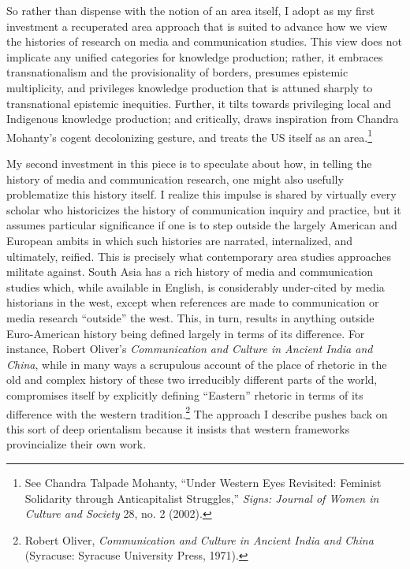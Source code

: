 \documentclass{tufte-handout}
\begin{document}
So rather than dispense with the notion of an area itself, I adopt as my
first investment a recuperated area approach that is suited to advance
how we view the histories of research on media and communication
studies. This view does not implicate any unified categories for
knowledge production; rather, it embraces transnationalism and the
provisionality of borders, presumes epistemic multiplicity, and
privileges knowledge production that is attuned sharply to transnational
epistemic inequities. Further, it tilts towards privileging local and
Indigenous knowledge production; and critically, draws inspiration from
Chandra Mohanty's cogent decolonizing gesture, and treats the US itself
as an area.\footnote{See Chandra Talpade Mohanty, ``Under Western Eyes
  Revisited: Feminist Solidarity through Anticapitalist Struggles,''
  \emph{Signs: Journal of Women in Culture and Society} 28, no. 2
  (2002).}

My second investment in this piece is to speculate about how, in telling
the history of media and communication research, one might also usefully
problematize this history itself. I realize this impulse is shared by
virtually every scholar who historicizes the history of communication
inquiry and practice, but it assumes particular significance if one is
to step outside the largely American and European ambits in which such
histories are narrated, internalized, and ultimately, reified. This is
precisely what contemporary area studies approaches militate against.
South Asia has a rich history of media and communication studies which,
while available in English, is considerably under-cited by media
historians in the west, except when references are made to communication
or media research ``outside'' the west. This, in turn, results in
anything outside Euro-American history being defined largely in terms of
its difference. For instance, Robert Oliver's \emph{Communication and
Culture in Ancient India and China}, while in many ways a scrupulous
account of the place of rhetoric in the old and complex history of these
two irreducibly different parts of the world, compromises itself by
explicitly defining ``Eastern'' rhetoric in terms of its difference with
the western tradition.\footnote{Robert Oliver, \emph{Communication and
  Culture in Ancient India and China} (Syracuse: Syracuse University
  Press, 1971).} The approach I describe pushes back on this sort of
deep orientalism because it insists that western frameworks
provincialize their own work.
\end{document}

